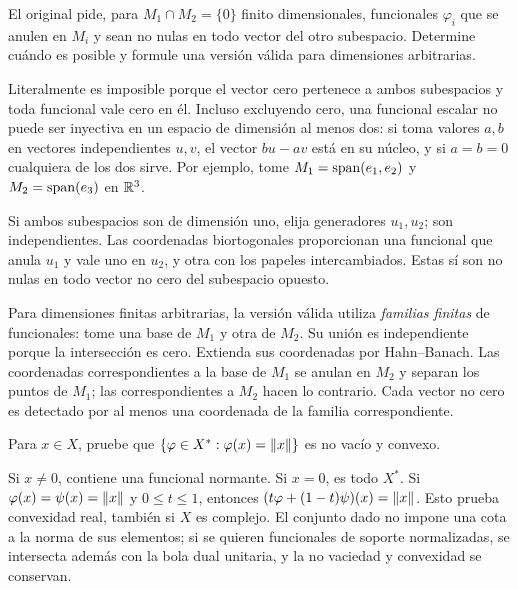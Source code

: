 \begin{ejercicio}\label{ej:v3-l02-3}
El original pide, para $M_1\cap M_2=\{0\}$ finito dimensionales, funcionales $\varphi_i$ que se anulen en $M_i$ y sean no nulas en todo vector del otro subespacio. Determine cuándo es posible y formule una versión válida para dimensiones arbitrarias.
\end{ejercicio}
\begin{solucion}
Literalmente es imposible porque el vector cero pertenece a ambos subespacios y toda funcional vale cero en él. Incluso excluyendo cero, una funcional escalar no puede ser inyectiva en un espacio de dimensión al menos dos: si toma valores $a,b$ en vectores independientes $u,v$, el vector $bu-av$ está en su núcleo, y si $a=b=0$ cualquiera de los dos sirve. Por ejemplo, tome $M_1=\operatorname{span}(e_1,e_2)$ y $M_2=\operatorname{span}(e_3)$ en $\mathbb R^3$.

Si ambos subespacios son de dimensión uno, elija generadores $u_1,u_2$; son independientes. Las coordenadas biortogonales proporcionan una funcional que anula $u_1$ y vale uno en $u_2$, y otra con los papeles intercambiados. Estas sí son no nulas en todo vector no cero del subespacio opuesto.

Para dimensiones finitas arbitrarias, la versión válida utiliza \emph{familias finitas} de funcionales: tome una base de $M_1$ y otra de $M_2$. Su unión es independiente porque la intersección es cero. Extienda sus coordenadas por Hahn--Banach. Las coordenadas correspondientes a la base de $M_1$ se anulan en $M_2$ y separan los puntos de $M_1$; las correspondientes a $M_2$ hacen lo contrario. Cada vector no cero es detectado por al menos una coordenada de la familia correspondiente.
\end{solucion}

\begin{ejercicio}\label{ej:v3-l02-4}
Para $x\in X$, pruebe que $\{\varphi\in X^*: \varphi(x)=\left\lVert x\right\rVert\}$ es no vacío y convexo.
\end{ejercicio}
\begin{solucion}
Si $x\ne0$, contiene una funcional normante. Si $x=0$, es todo $X^*$. Si $\varphi(x)=\psi(x)=\left\lVert x\right\rVert$ y $0\leq t\leq1$, entonces $(t\varphi+(1-t)\psi)(x)=\left\lVert x\right\rVert$. Esto prueba convexidad real, también si $X$ es complejo. El conjunto dado no impone una cota a la norma de sus elementos; si se quieren funcionales de soporte normalizadas, se intersecta además con la bola dual unitaria, y la no vaciedad y convexidad se conservan.
\end{solucion}

